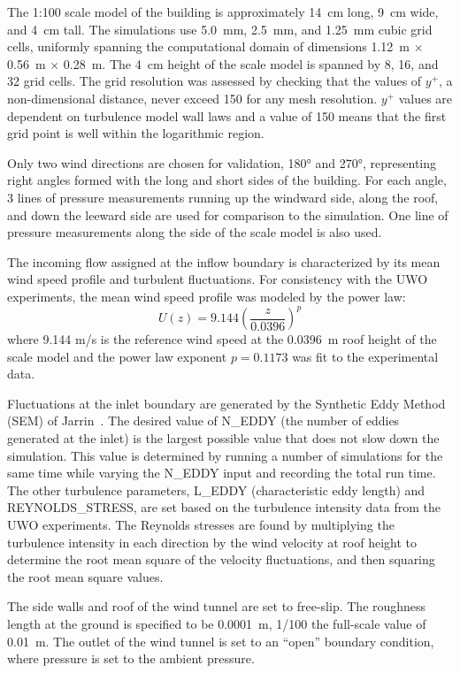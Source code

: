 The 1:100 scale model of the building is approximately 14~cm long, 9~cm wide, and 4~cm tall. The simulations use 5.0~mm, 2.5~mm, and 1.25~mm cubic grid cells, uniformly spanning the computational domain of dimensions 1.12~m $\times$ 0.56~m $\times$ 0.28~m. The 4~cm height of the scale model is spanned by 8, 16, and 32 grid cells. The grid resolution was assessed by checking that the values of $y^+$, a non-dimensional distance, never exceed 150 for any mesh resolution. $y^+$ values are dependent on turbulence model wall laws and a value of 150 means that the first grid point is well within the logarithmic region.

Only two wind directions are chosen for validation, 180\si{\degree} and 270\si{\degree}, representing right angles formed with the long and short sides of the building. For each angle, 3 lines of pressure measurements running up the windward side, along the roof, and down the leeward side are used for comparison to the simulation. One line of pressure measurements along the side of the scale model is also used.

The incoming flow assigned at the inflow boundary is characterized by its mean wind speed profile and turbulent fluctuations. For consistency with the UWO experiments, the mean wind speed profile was modeled by the power law:
\begin{equation}
U(z) = 9.144 \left(\frac{z}{0.0396}\right)^p
\end{equation}
where 9.144 m/s is the reference wind speed at the 0.0396~m roof height of the scale model and the power law exponent $p=0.1173$ was fit to the experimental data.

Fluctuations at the inlet boundary are generated by the Synthetic Eddy Method (SEM) of Jarrin~\cite{Jarrin:2008}. The desired value of {\ct N\_EDDY} (the number of eddies generated at the inlet) is the largest possible value that does not slow down the simulation. This value is determined by running a number of simulations for the same time while varying the {\ct N\_EDDY} input and recording the total run time. The other turbulence parameters, {\ct L\_EDDY} (characteristic eddy length) and {\ct REYNOLDS\_STRESS}, are set based on the turbulence intensity data from the UWO experiments. The Reynolds stresses are found by multiplying the turbulence intensity in each direction by the wind velocity at roof height to determine the root mean square of the velocity fluctuations, and then squaring the root mean square values.

The side walls and roof of the wind tunnel are set to free-slip. The roughness length at the ground is specified to be 0.0001~m, 1/100 the full-scale value of 0.01~m. The outlet of the wind tunnel is set to an ``open'' boundary condition, where pressure is set to the ambient pressure.


